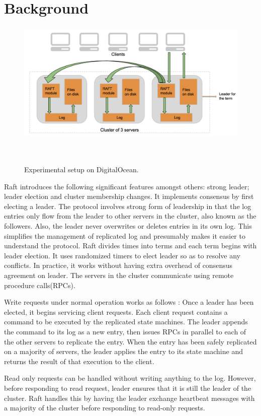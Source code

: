 \section{Background}

\begin{figure}
\centering
\includegraphics[height=2.3in, width=5in]{images/SystemModel.png}
\caption{Experimental setup on DigitalOcean.}~\label{fig:figure1}
\end{figure}

Raft introduces the following significant features amongst others: strong leader; leader election and cluster membership changes. It implements consensus by first electing a leader. The protocol involves strong form of leadership in that the log entries only flow from the leader to other servers in the cluster, also known as the followers. Also, the leader never overwrites or deletes entries in its own log. This simplifies the management of replicated log and presumably makes it easier to understand the protocol. Raft divides times into terms and each term begins with leader election. It uses randomized timers to elect leader so as to resolve any conflicts. In practice, it works without having extra overhead of consensus agreement on leader. The servers in the cluster communicate using remote procedure calls(RPCs).

Write requests under normal operation works as follows : Once a leader has been elected, it begins servicing client requests. Each client request contains a command to be executed by the replicated state machines. The leader appends the command to its log as a new entry, then issues RPCs in parallel to each of the other servers to replicate the entry. When the entry has been safely replicated on a majority of servers, the leader applies the entry to its state machine and returns the result of that execution to the client. 

Read only requests can be handled without writing anything to the log. However, before responding to read request, leader ensures that it is still the leader of the cluster. Raft handles this by having the leader exchange heartbeat messages with a majority of the cluster before responding to read-only requests.

